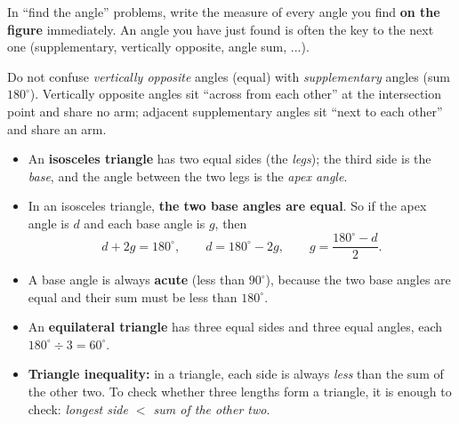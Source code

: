 \begin{tipbox}
In ``find the angle'' problems, write the measure of every angle you find \textbf{on the figure} immediately. An angle you have just found is often the key to the next one (supplementary, vertically opposite, angle sum, ...).
\end{tipbox}

\begin{warnbox}
Do not confuse \emph{vertically opposite} angles (equal) with \emph{supplementary} angles (sum $180^\circ$). Vertically opposite angles sit ``across from each other'' at the intersection point and share no arm; adjacent supplementary angles sit ``next to each other'' and share an arm.
\end{warnbox}

\begin{knowbox}
\begin{itemize}[leftmargin=1.3em,itemsep=2pt,topsep=2pt]
  \item An \textbf{isosceles triangle} has two equal sides (the \emph{legs}); the third side is the \emph{base}, and the angle between the two legs is the \emph{apex angle}.
  \item In an isosceles triangle, \textbf{the two base angles are equal}. So if the apex angle is $d$ and each base angle is $g$, then
  \[ d+2g=180^\circ,\qquad d=180^\circ-2g,\qquad g=\frac{180^\circ-d}{2}. \]
  \item A base angle is always \textbf{acute} (less than $90^\circ$), because the two base angles are equal and their sum must be less than $180^\circ$.
  \item An \textbf{equilateral triangle} has three equal sides and three equal angles, each $180^\circ\div3=60^\circ$.
  \item \textbf{Triangle inequality:} in a triangle, each side is always \emph{less} than the sum of the other two. To check whether three lengths form a triangle, it is enough to check: \emph{longest side $<$ sum of the other two}.
\end{itemize}
\end{knowbox}

